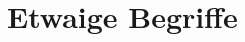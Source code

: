 \documentclass[ngerman]{report}
\theoremstyle{plain}%
\theoremstyle{definition}%
\theoremstyle{myStyle}
\begin{document}
\appendix 

\chapter{Etwaige Begriffe}
	
%	
%	
%		
%		

\glsaddall

\printnoidxglossary
\end{document}

